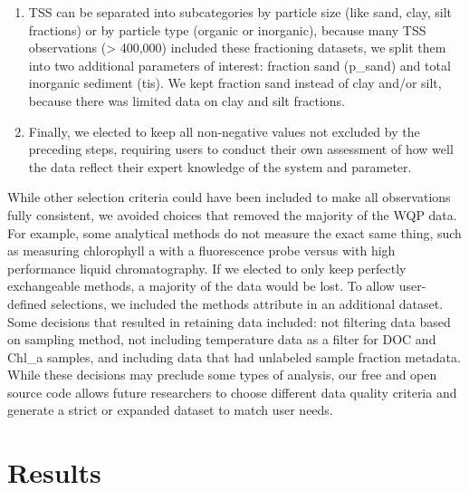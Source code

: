 \documentclass[]{agujournal2018}
\begin{document}
\begin{enumerate}
\item
  TSS can be separated into subcategories by particle size (like sand,
  clay, silt fractions) or by particle type (organic or inorganic),
  because many TSS observations (\textgreater{} 400,000) included these
  fractioning datasets, we split them into two additional parameters of
  interest: fraction sand (p\_sand) and total inorganic sediment (tis).
  We kept fraction sand instead of clay and/or silt, because there was
  limited data on clay and silt fractions.
\item
  Finally, we elected to keep all non-negative values not excluded by
  the preceding steps, requiring users to conduct their own assessment
  of how well the data reflect their expert knowledge of the system and
  parameter.
\end{enumerate}

While other selection criteria could have been included to make all
observations fully consistent, we avoided choices that removed the
majority of the WQP data. For example, some analytical methods do not
measure the exact same thing, such as measuring chlorophyll a with a
fluorescence probe versus with high performance liquid chromatography.
If we elected to only keep perfectly exchangeable methods, a majority of
the data would be lost. To allow user-defined selections, we included
the methods attribute in an additional dataset. Some decisions that
resulted in retaining data included: not filtering data based on
sampling method, not including temperature data as a filter for DOC and
Chl\_a samples, and including data that had unlabeled sample fraction
metadata. While these decisions may preclude some types of analysis, our
free and open source code allows future researchers to choose different
data quality criteria and generate a strict or expanded dataset to match
user needs.

\section{Results}
\end{document}
